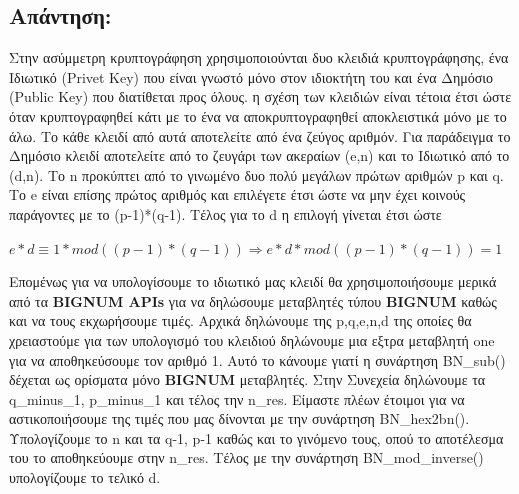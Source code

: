 \subsection*{Απάντηση:}
\noindent
Στην ασύμμετρη κρυπτογράφηση χρησιμοποιούνται δυο κλειδιά κρυπτογράφησης, ένα Ιδιωτικό (Privet Key)
που είναι γνωστό μόνο στον ιδιοκτήτη του και ένα Δημόσιο (Public Key) που διατίθεται προς όλους.
η σχέση των κλειδιών είναι τέτοια έτσι ώστε όταν κρυπτογραφηθεί κάτι με το ένα να αποκρυπτογραφηθεί 
αποκλειστικά μόνο με το άλω. Το κάθε κλειδί από αυτά αποτελείτε από ένα ζεύγος αριθμόν. Για παράδειγμα 
το Δημόσιο κλειδί αποτελείτε από το ζευγάρι των ακεραίων (e,n) και το Ιδιωτικό από το (d,n). Το n προκύπτει
από το γινωμένο δυο πολύ μεγάλων πρώτων αριθμών p και q. Το e είναι επίσης πρώτος αριθμός και επιλέγετε έτσι ώστε να μην έχει κοινούς παράγοντες με το (p-1)*(q-1). Τέλος για το d η επιλογή γίνεται έτσι ώστε
\begin{center}
	\textbf{	\Large \(e * d \equiv 1 * mod((p - 1)*(q-1)) \Rightarrow e * d *mod((p - 1)*(q-1))=1 \)}	
\end{center}
\noindent
Επομένως για να υπολογίσουμε το ιδιωτικό μας κλειδί θα χρησιμοποιήσουμε μερικά από τα \textbf{BIGNUM APIs}
για να δηλώσουμε μεταβλητές τύπου \textbf{BIGNUM} καθώς και να τους εκχωρήσουμε τιμές.
Αρχικά δηλώνουμε της p,q,e,n,d της οποίες θα χρειαστούμε για των υπολογισμό του κλειδιού 
δηλώνουμε μια εξτρα μεταβλητή one για να αποθηκεύσουμε τον αριθμό 1. Αυτό το κάνουμε γιατί 
η συνάρτηση BN\_sub() δέχεται ως ορίσματα μόνο \textbf{BIGNUM} μεταβλητές. Στην Συνεχεία 
δηλώνουμε τα q\_minus\_1, p\_minus\_1 και τέλος την n\_res. Είμαστε πλέων έτοιμοι για να 
αστικοποιήσουμε της τιμές που μας δίνονται με την συνάρτηση BN\_hex2bn(). Υπολογίζουμε το n και 
τα q-1, p-1 καθώς και το γινόμενο τους, οπού το αποτέλεσμα του το αποθηκεύουμε στην n\_res. Τέλος 
με την συνάρτηση BN\_mod\_inverse() υπολογίζουμε το τελικό d.


